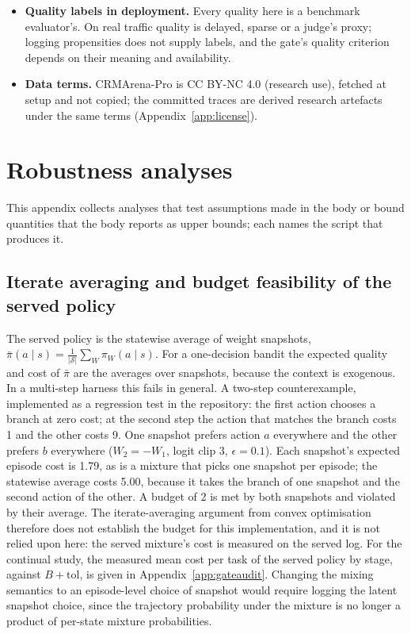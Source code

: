 \documentclass[10pt]{article}
\begin{document}
\begin{itemize}
\item \textbf{Quality labels in deployment.} Every quality here is a benchmark evaluator's. On real traffic quality is delayed, sparse or a judge's proxy; logging propensities does not supply labels, and the gate's quality criterion depends on their meaning and availability.
\item \textbf{Data terms.} CRMArena-Pro is CC BY-NC 4.0 (research use), fetched at setup and not copied; the committed traces are derived research artefacts under the same terms (Appendix~\ref{app:license}).
\end{itemize}

\section{Robustness analyses}
\label{app:review}

This appendix collects analyses that test assumptions made in the body or bound quantities that the body reports as upper bounds; each names the script that produces it.

\subsection{Iterate averaging and budget feasibility of the served policy}
\label{app:mixture}

The served policy is the statewise average of weight snapshots, $\bar\pi(a\mid s)=\frac1{|\mathcal S|}\sum_W\pi_W(a\mid s)$. For a one-decision bandit the expected quality and cost of $\bar\pi$ are the averages over snapshots, because the context is exogenous. In a multi-step harness this fails in general. A two-step counterexample, implemented as a regression test in the repository: the first action chooses a branch at zero cost; at the second step the action that matches the branch costs 1 and the other costs 9. One snapshot prefers action $a$ everywhere and the other prefers $b$ everywhere ($W_2=-W_1$, logit clip 3, $\epsilon=0.1$). Each snapshot's expected episode cost is 1.79, as is a mixture that picks one snapshot per episode; the statewise average costs 5.00, because it takes the branch of one snapshot and the second action of the other. A budget of 2 is met by both snapshots and violated by their average. The iterate-averaging argument from convex optimisation \citep{nedic2009saddle} therefore does not establish the budget for this implementation, and it is not relied upon here: the served mixture's cost is measured on the served log. For the continual study, the measured mean cost per task of the served policy by stage, against $B+\mathrm{tol}$, is given in Appendix~\ref{app:gateaudit}. Changing the mixing semantics to an episode-level choice of snapshot would require logging the latent snapshot choice, since the trajectory probability under the mixture is no longer a product of per-state mixture probabilities.
\end{document}
